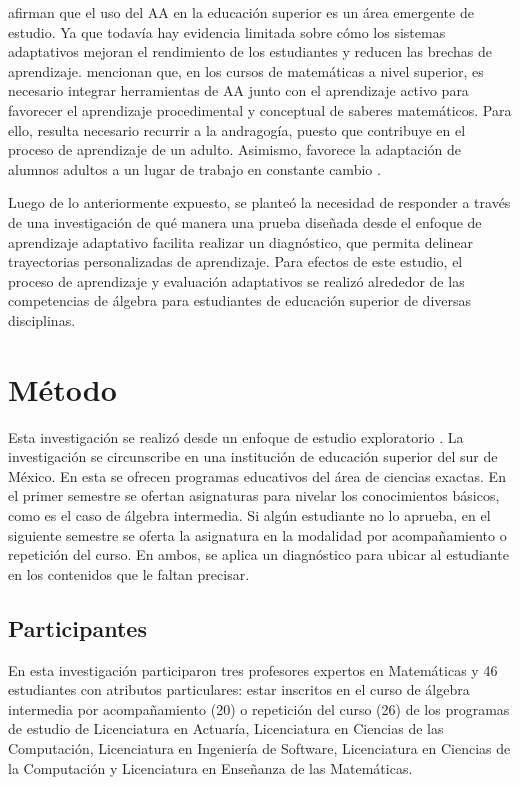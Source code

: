 \documentclass[spanish]{textolivre}
\begin{document}
\textcite{anderson2019,dziuban2017,dziuban2016,feldman2017,educause2019}
afirman que el uso del AA en la educación superior es un área emergente de estudio. Ya que todavía hay evidencia limitada sobre cómo los sistemas adaptativos mejoran el rendimiento de los estudiantes y reducen las brechas de aprendizaje. \textcite{boyce2020} mencionan que, en los cursos de matemáticas a nivel superior, es necesario integrar herramientas de AA junto con el aprendizaje activo para favorecer el aprendizaje procedimental y conceptual de saberes matemáticos. Para ello, resulta necesario recurrir a la andragogía, puesto que contribuye en el proceso de aprendizaje de un adulto. Asimismo, favorece la adaptación de alumnos adultos a un lugar de trabajo en constante cambio \cite{cretchley2001,merriam2001}.

Luego de lo anteriormente expuesto, se planteó la necesidad de responder a través de una investigación de qué manera una prueba diseñada desde el enfoque de aprendizaje adaptativo facilita realizar un diagnóstico, que permita delinear trayectorias personalizadas de aprendizaje. Para efectos de este estudio, el proceso de aprendizaje y evaluación adaptativos se realizó alrededor de las competencias de álgebra para estudiantes de educación superior de diversas disciplinas.

\section{Método}\label{sec-normas}
Esta investigación se realizó desde un enfoque de estudio exploratorio \textcite{gonzalez2014}. La investigación se circunscribe en una institución de educación superior del sur de México. En esta se ofrecen programas educativos del área de ciencias exactas. En el primer semestre se ofertan asignaturas para nivelar los conocimientos básicos, como es el caso de álgebra intermedia. Si algún estudiante no lo aprueba, en el siguiente semestre se oferta la asignatura en la modalidad por acompañamiento o repetición del curso. En ambos, se aplica un diagnóstico para ubicar al estudiante en los contenidos que le faltan precisar.

\subsection{Participantes}\label{sec-conduta}
En esta investigación participaron tres profesores expertos en Matemáticas y 46 estudiantes con atributos particulares: estar inscritos en el curso de álgebra intermedia por acompañamiento (20) o repetición del curso (26) de los programas de estudio de Licenciatura en Actuaría, Licenciatura en Ciencias de las Computación, Licenciatura en Ingeniería de Software, Licenciatura en Ciencias de la Computación y Licenciatura en Enseñanza de las Matemáticas.
\end{document}
